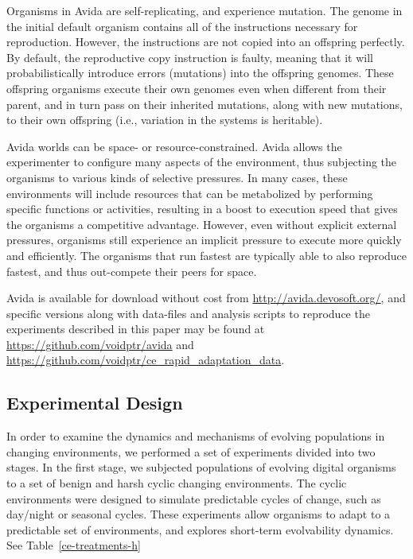 \documentclass[10pt,letterpaper,final]{article}
\begin{document}
Organisms in Avida are self-replicating, and experience mutation. The genome in the initial default organism contains all of the instructions necessary for reproduction. However, the instructions are not copied into an offspring perfectly. By default, the reproductive copy instruction is faulty, meaning that it will probabilistically introduce errors (mutations) into the offspring genomes. These offspring organisms execute their own genomes even when different from their parent, and in turn pass on their inherited mutations, along with new mutations, to their own offspring (i.e., variation in the systems is heritable).

Avida worlds can be space- or resource-constrained. Avida allows the experimenter to configure many aspects of the environment, thus subjecting the organisms to various kinds of selective pressures.  In many cases, these environments will include resources that can be metabolized by performing specific functions or activities, resulting in a boost to execution speed that gives the organisms a competitive advantage. However, even without explicit external pressures, organisms still experience an implicit pressure to execute more quickly and efficiently. The organisms that run fastest are typically able to also reproduce fastest, and thus out-compete their peers for space.

Avida is available for download without cost from \url{http://avida.devosoft.org/}, and specific versions along with data-files and analysis scripts to reproduce the experiments described in this paper may be found at \url{https://github.com/voidptr/avida} and \url{https://github.com/voidptr/ce_rapid_adaptation_data}.

\subsection*{Experimental Design}
In order to examine the dynamics and mechanisms of evolving populations in changing environments, we performed a set of experiments divided into two stages. In the first stage, we subjected populations of evolving digital organisms to a set of benign and harsh cyclic changing environments. The cyclic environments were designed to simulate predictable cycles of change, such as day/night or seasonal cycles. These experiments allow organisms to adapt to a predictable set of environments, and explores short-term evolvability dynamics. See Table~\ref{ce-treatments-h}
\end{document}

